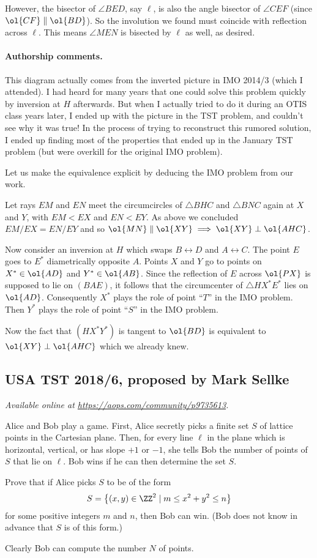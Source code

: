 \documentclass[11pt]{scrartcl}
\begin{document}
However, the bisector of $\angle BED$, say $\ell$,
is also the angle bisector of $\angle CEF$ (since $\ol{CF} \parallel \ol{BD}$).
So the involution we found must coincide with reflection across $\ell$.
This means $\angle MEN$ is bisected by $\ell$ as well, as desired.

\paragraph{Authorship comments.}
This diagram actually comes from the inverted
picture in IMO 2014/3 (which I attended).
I had heard for many years that one could
solve this problem quickly by inversion at $H$ afterwards.
But when I actually tried to do it during an OTIS class
years later, I ended up with the picture in the TST problem,
and couldn't see why it was true!
In the process of trying to reconstruct this rumored solution,
I ended up finding most of the properties
that ended up in the January TST problem
(but were overkill for the original IMO problem).

Let us make the equivalence explicit
by deducing the IMO problem from our work.

Let rays $EM$ and $EN$ meet the circumcircles of $\triangle BHC$
and $\triangle BNC$ again at $X$ and $Y$, with $EM < EX$ and $EN < EY$.
As above we concluded $EM/EX = EN/EY$
and so $\ol{MN} \parallel \ol{XY} \implies \ol{XY} \perp \ol{AHC}$.

Now consider an inversion at $H$ which swaps
$B \leftrightarrow D$ and $A \leftrightarrow C$.
The point $E$ goes to $E^\ast$ diametrically opposite $A$.
Points $X$ and $Y$ go to points on $X^\ast \in \ol{AD}$ and $Y^\ast \in \ol{AB}$.
Since the reflection of $E$ across $\ol{PX}$ is supposed to lie on $(BAE)$,
it follows that the circumcenter of $\triangle HX^\ast E^\ast$
lies on $\ol{AD}$.
Consequently $X^\ast$ plays the role of point ``$T$'' in the IMO problem.
Then $Y^\ast$ plays the role of point ``$S$'' in the IMO problem.

Now the fact that $(HX^\ast Y^\ast)$ is tangent to $\ol{BD}$
is equivalent to $\ol{XY} \perp \ol{AHC}$ which we already knew.
\pagebreak

\subsection{USA TST 2018/6, proposed by Mark Sellke}
\textsl{Available online at \url{https://aops.com/community/p9735613}.}
\begin{mdframed}[style=mdpurplebox,frametitle={Problem statement}]
Alice and Bob play a game.
First, Alice secretly picks a finite set $S$
of lattice points in the Cartesian plane.
Then, for every line $\ell$ in the plane
which is horizontal, vertical, or has slope $+1$ or $-1$,
she tells Bob the number of points of $S$ that lie on $\ell$.
Bob wins if he can then determine the set $S$.

Prove that if Alice picks $S$ to be of the form
\[ S = \left\{ (x,y) \in \ZZ^2 \mid m \le x^2+y^2 \le n \right\} \]
for some positive integers $m$ and $n$, then Bob can win.
(Bob does not know in advance that $S$ is of this form.)
\end{mdframed}
Clearly Bob can compute the number $N$ of points.
\end{document}
